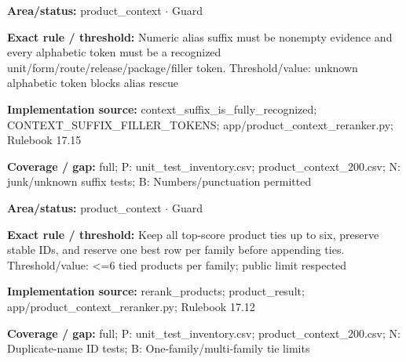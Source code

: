 \begin{tcolorbox}[enhanced,breakable,colback=white,colframe=Muted!45,boxrule=0.45pt,arc=1.5pt,left=6pt,right=6pt,top=5pt,bottom=5pt,title={\texttt{PC-SUFFIX-RECOGNITION-20}},title after break={\texttt{PC-SUFFIX-RECOGNITION-20}\ (continued)},fonttitle=\headingfont\bfseries\color{Navy},coltitle=Navy]
\textbf{Area/status:} product\_\allowbreak{}context $\boldsymbol{\cdot}$ Guard\par
\smallskip
\textbf{Exact rule / threshold:} Numeric alias suffix must be nonempty evidence and every alphabetic token must be a recognized unit/\allowbreak{}form/\allowbreak{}route/\allowbreak{}release/\allowbreak{}package/\allowbreak{}filler token. Threshold/\allowbreak{}value: unknown alphabetic token blocks alias rescue\par
\smallskip
\textbf{Implementation source:} context\_\allowbreak{}suffix\_\allowbreak{}is\_\allowbreak{}fully\_\allowbreak{}recognized; CONTEXT\_\allowbreak{}SUFFIX\_\allowbreak{}FILLER\_\allowbreak{}TOKENS; app/\allowbreak{}product\_\allowbreak{}context\_\allowbreak{}reranker.py; Rulebook 17.15\par
\smallskip
\textbf{Coverage / gap:} full; P: unit\_\allowbreak{}test\_\allowbreak{}inventory.csv; product\_\allowbreak{}context\_\allowbreak{}200.csv; N: junk/\allowbreak{}unknown suffix tests; B: Numbers/\allowbreak{}punctuation permitted
\end{tcolorbox}
\begin{tcolorbox}[enhanced,breakable,colback=white,colframe=Muted!45,boxrule=0.45pt,arc=1.5pt,left=6pt,right=6pt,top=5pt,bottom=5pt,title={\texttt{PC-TIES-17}},title after break={\texttt{PC-TIES-17}\ (continued)},fonttitle=\headingfont\bfseries\color{Navy},coltitle=Navy]
\textbf{Area/status:} product\_\allowbreak{}context $\boldsymbol{\cdot}$ Guard\par
\smallskip
\textbf{Exact rule / threshold:} Keep all top-score product ties up to six, preserve stable IDs, and reserve one best row per family before appending ties. Threshold/\allowbreak{}value: <=6 tied products per family; public limit respected\par
\smallskip
\textbf{Implementation source:} rerank\_\allowbreak{}products; product\_\allowbreak{}result; app/\allowbreak{}product\_\allowbreak{}context\_\allowbreak{}reranker.py; Rulebook 17.12\par
\smallskip
\textbf{Coverage / gap:} full; P: unit\_\allowbreak{}test\_\allowbreak{}inventory.csv; product\_\allowbreak{}context\_\allowbreak{}200.csv; N: Duplicate-name ID tests; B: One-family/\allowbreak{}multi-family tie limits
\end{tcolorbox}
